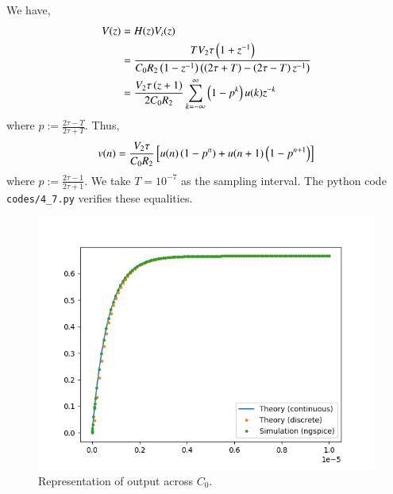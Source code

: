 \documentclass[journal,12pt,twocolumn]{IEEEtran}
\renewcommand\thesection{\arabic{section}}
\begin{document}
\begin{enumerate}[label=\arabic*.,ref=\thesection.\theenumi]
\solution We have,
\begin{align}
    V(z) &= H(z)V_i(z) \\
         &= \frac{TV_2\tau\left(1+z^{-1}\right)}{C_0R_2\left(1-z^{-1}\right)\left(\left(2\tau+T\right)-\left(2\tau-T\right)z^{-1}\right)} \\
         &= \frac{V_2\tau\left(z+1\right)}{2C_0R_2}\sum_{k=-\infty}^{\infty}\left(1-p^k\right)u(k)z^{-k}
\end{align}
where $p := \frac{2\tau-T}{2\tau+T}$. Thus,
\begin{align}
    v(n) = \frac{V_2\tau}{C_0R_2}{}\left[u(n)\left(1-p^n\right)+u(n+1)\left(1-p^{n+1}\right)\right]
\end{align}
where $p := \frac{2\tau-1}{2\tau+1}$. We take $T = 10^{-7}$ as the
sampling interval. The python code \texttt{codes/4\_7.py} verifies
these equalities.
\begin{figure}
    \includegraphics[width=\columnwidth]{cktsig/figs/4_7.png}
    \caption{Representation of output across $C_0$.}
    \label{fig:cktsig/bilinear/cktsig/vc0}
\end{figure}
\end{enumerate}
\fi
\end{document}
